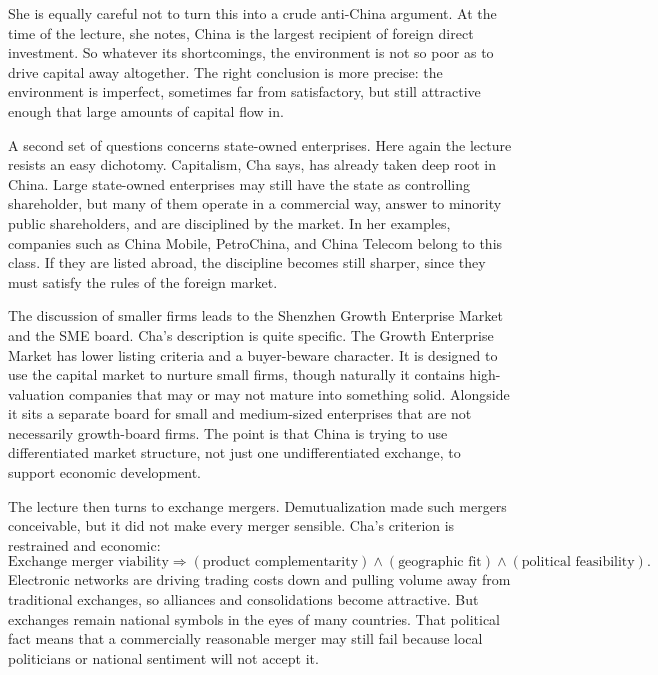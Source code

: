 She is equally careful not to turn this into a crude anti-China argument. At the time of the lecture, she notes, China is the largest recipient of foreign direct investment. So whatever its shortcomings, the environment is not so poor as to drive capital away altogether. The right conclusion is more precise: the environment is imperfect, sometimes far from satisfactory, but still attractive enough that large amounts of capital flow in.

A second set of questions concerns state-owned enterprises. Here again the lecture resists an easy dichotomy. Capitalism, Cha says, has already taken deep root in China. Large state-owned enterprises may still have the state as controlling shareholder, but many of them operate in a commercial way, answer to minority public shareholders, and are disciplined by the market. In her examples, companies such as China Mobile, PetroChina, and China Telecom belong to this class. If they are listed abroad, the discipline becomes still sharper, since they must satisfy the rules of the foreign market.

The discussion of smaller firms leads to the Shenzhen Growth Enterprise Market and the SME board. Cha's description is quite specific. The Growth Enterprise Market has lower listing criteria and a buyer-beware character. It is designed to use the capital market to nurture small firms, though naturally it contains high-valuation companies that may or may not mature into something solid. Alongside it sits a separate board for small and medium-sized enterprises that are not necessarily growth-board firms. The point is that China is trying to use differentiated market structure, not just one undifferentiated exchange, to support economic development.

The lecture then turns to exchange mergers. Demutualization made such mergers conceivable, but it did not make every merger sensible. Cha's criterion is restrained and economic:
\begin{equation}
\text{Exchange merger viability}
\Rightarrow
(\text{product complementarity})
\land
(\text{geographic fit})
\land
(\text{political feasibility}).
\end{equation}
Electronic networks are driving trading costs down and pulling volume away from traditional exchanges, so alliances and consolidations become attractive. But exchanges remain national symbols in the eyes of many countries. That political fact means that a commercially reasonable merger may still fail because local politicians or national sentiment will not accept it.

